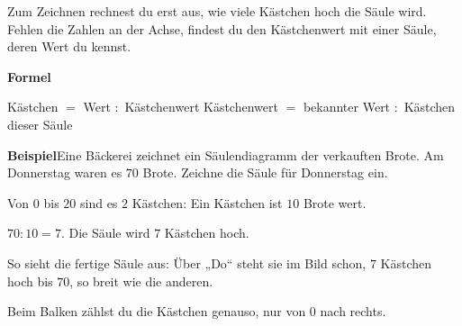 \documentclass[11pt]{article}
\newlength{\kr}
\begin{document}
\fi\par
\clearpage\label{s:D}\noindent\colorbox{black!12}{}\hspace{3mm}{\Large\bfseries Säulen zeichnen und Achse einteilen}\par\smallskip
\noindent Zum Zeichnen rechnest du erst aus, wie viele Kästchen hoch die Säule wird. Fehlen die Zahlen an der Achse, findest du den Kästchenwert mit einer Säule, deren Wert du kennst.\par\medskip
\noindent\textbf{Formel}\par\nopagebreak\noindent\hspace*{4mm}\begin{minipage}{\dimexpr\linewidth-4mm\relax}Kästchen $=$ Wert $:$ Kästchenwert \qquad Kästchenwert $=$ bekannter Wert $:$ Kästchen dieser Säule\end{minipage}\par\medskip
\noindent\textbf{Beispiel}\quad Eine Bäckerei zeichnet ein Säulendiagramm der verkauften Brote. Am Donnerstag waren es $70$ Brote. Zeichne die Säule für Donnerstag ein.\par\smallskip
\noindent\begin{minipage}[t]{0.6\linewidth}\vspace{0pt}\par\noindent{}Von $0$ bis $20$ sind es $2$ Kästchen: Ein Kästchen ist $10$ Brote wert.\par\smallskip\par\noindent{}$70 : 10 = 7$. Die Säule wird $7$ Kästchen hoch.\par\smallskip\par\noindent{}So sieht die fertige Säule aus: Über „Do“ steht sie im Bild schon, $7$ Kästchen hoch bis $70$, so breit wie die anderen.\par\smallskip\par\noindent{}Beim Balken zählst du die Kästchen genauso, nur von $0$ nach rechts.\par\smallskip\end{minipage}\hfill
\begin{minipage}[t]{0.37\linewidth}\vspace{0pt}\centering {}\end{minipage}\par\medskip
\end{document}
